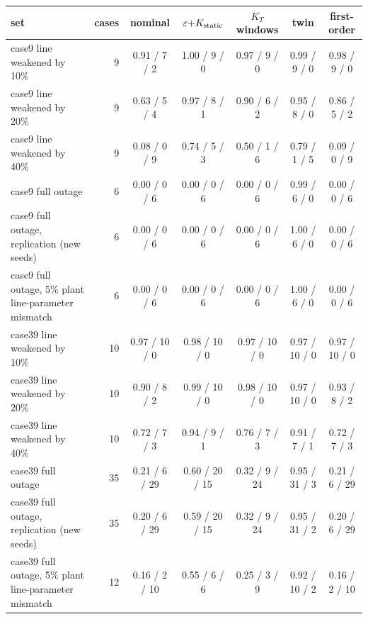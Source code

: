 \begin{tabular}{@{}lrccccc@{}}
\toprule
set & cases & nominal & $\varepsilon{+}K_{\rm static}$ & $K_T$ windows & twin & first-order\\
\midrule
case9 line weakened by 10\% & 9 & 0.91 / 7 / 2 & 1.00 / 9 / 0 & 0.97 / 9 / 0 & 0.99 / 9 / 0 & 0.98 / 9 / 0\\
case9 line weakened by 20\% & 9 & 0.63 / 5 / 4 & 0.97 / 8 / 1 & 0.90 / 6 / 2 & 0.95 / 8 / 0 & 0.86 / 5 / 2\\
case9 line weakened by 40\% & 9 & 0.08 / 0 / 9 & 0.74 / 5 / 3 & 0.50 / 1 / 6 & 0.79 / 1 / 5 & 0.09 / 0 / 9\\
case9 full outage & 6 & 0.00 / 0 / 6 & 0.00 / 0 / 6 & 0.00 / 0 / 6 & 0.99 / 6 / 0 & 0.00 / 0 / 6\\
case9 full outage, replication (new seeds) & 6 & 0.00 / 0 / 6 & 0.00 / 0 / 6 & 0.00 / 0 / 6 & 1.00 / 6 / 0 & 0.00 / 0 / 6\\
case9 full outage, 5\% plant line-parameter mismatch & 6 & 0.00 / 0 / 6 & 0.00 / 0 / 6 & 0.00 / 0 / 6 & 1.00 / 6 / 0 & 0.00 / 0 / 6\\
case39 line weakened by 10\% & 10 & 0.97 / 10 / 0 & 0.98 / 10 / 0 & 0.97 / 10 / 0 & 0.97 / 10 / 0 & 0.97 / 10 / 0\\
case39 line weakened by 20\% & 10 & 0.90 / 8 / 2 & 0.99 / 10 / 0 & 0.98 / 10 / 0 & 0.97 / 10 / 0 & 0.93 / 8 / 2\\
case39 line weakened by 40\% & 10 & 0.72 / 7 / 3 & 0.94 / 9 / 1 & 0.76 / 7 / 3 & 0.91 / 7 / 1 & 0.72 / 7 / 3\\
case39 full outage & 35 & 0.21 / 6 / 29 & 0.60 / 20 / 15 & 0.32 / 9 / 24 & 0.95 / 31 / 3 & 0.21 / 6 / 29\\
case39 full outage, replication (new seeds) & 35 & 0.20 / 6 / 29 & 0.59 / 20 / 15 & 0.32 / 9 / 24 & 0.95 / 31 / 2 & 0.20 / 6 / 29\\
case39 full outage, 5\% plant line-parameter mismatch & 12 & 0.16 / 2 / 10 & 0.55 / 6 / 6 & 0.25 / 3 / 9 & 0.92 / 10 / 2 & 0.16 / 2 / 10\\
\bottomrule
\end{tabular}
